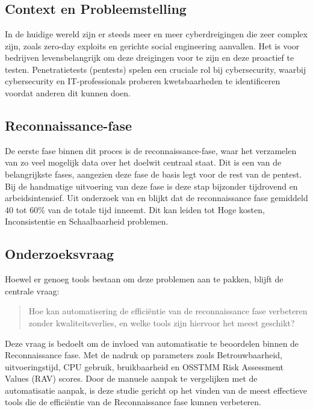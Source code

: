 
\chapter{}%
\label{ch:inleiding}

\section{Context en Probleemstelling}
In de huidige wereld zijn er steeds meer en meer cyberdreigingen die zeer complex zijn, zoals zero-day exploits en gerichte social engineering aanvallen. 
Het is voor bedrijven levensbelangrijk om deze dreigingen voor te zijn en deze proactief te testen. 
Penetratietests (pentests) spelen een cruciale rol bij cybersecurity, waarbij cybersecurity en IT-professionals proberen kwetsbaarheden te identificeren voordat anderen dit kunnen doen.

\section{Reconnaissance-fase}
De eerste fase binnen dit proces is de reconnaissance-fase, waar het verzamelen van zo veel mogelijk data over het doelwit centraal staat. 
Dit is een van de belangrijkste fases, aangezien deze fase de basis legt voor de rest van de pentest. 
Bij de handmatige uitvoering van deze fase is deze stap bijzonder tijdrovend en arbeidsintensief. 
Uit onderzoek van \textcite{Shah} en \textcite{Kothia} blijkt dat de reconnaissance fase gemiddeld 40 tot 60\% van de totale tijd inneemt. 
Dit kan leiden tot Hoge kosten, Inconsistentie en Schaalbaarheid problemen.

\section{Onderzoeksvraag}
Hoewel er genoeg tools bestaan om deze problemen aan te pakken, blijft de centrale vraag:
\begin{quote}
    Hoe kan automatisering de efficiëntie van de reconnaissance fase verbeteren zonder kwaliteitsverlies, en welke tools zijn hiervoor het meest geschikt?
\end{quote}

Deze vraag is bedoelt om de invloed van automatisatie te beoordelen binnen de Reconnaissance fase.
Met de nadruk op parameters zoals Betrouwbaarheid, uitvoeringstijd, CPU gebruik, bruikbaarheid en OSSTMM Risk Assessment Values (RAV) scores.
Door de manuele aanpak te vergelijken met de automatisatie aanpak, is deze studie gericht op het vinden van de meest effectieve tools die de efficiëntie van de Reconnaissance fase kunnen verbeteren.

